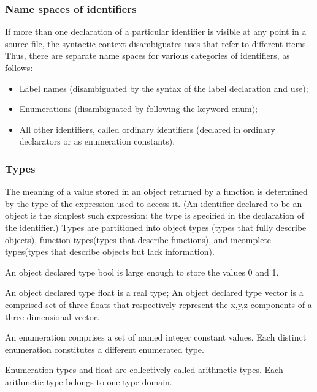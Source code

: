 \documentclass{article}
\begin{document}
\subsubsection{Name spaces of identifiers}
If more than one declaration of a particular identifier is visible at any point in a 
source file, the syntactic context disambiguates uses that refer to different items. 
Thus, there  are separate name spaces for various categories of identifiers, as follows:
\linebreak
\begin{itemize}
	\item Label names (disambiguated by the syntax of the label declaration and use);
	\item Enumerations (disambiguated by following the keyword enum);
	\item All other identifiers, called ordinary identifiers (declared in ordinary
	      declarators or as enumeration constants).
\end{itemize}

\subsubsection{Types}
The meaning of a value stored in an object returned by a function is determined by the 
type  of the expression used to access it. (An identifier declared to be an object is the simplest
such expression; the type is specified in the declaration of the identifier.)  Types are 
partitioned into object types (types that fully describe objects), function types(types 
that  describe functions), and incomplete types(types that describe objects but lack 
information).
\linebreak

An object declared type bool is large enough to store the values 0 and 1.
\linebreak

An object declared type float is a real type; An object declared type vector is a 
comprised set of three floats that respectively represent the \underline{x,y,z} 
components of a three-dimensional vector.
\linebreak

An enumeration comprises a set of named integer constant values.  Each distinct 
enumeration constitutes a different enumerated type.
\linebreak

Enumeration types and float are collectively called arithmetic types. Each arithmetic 
type belongs to one type domain.
\linebreak
\end{document}
